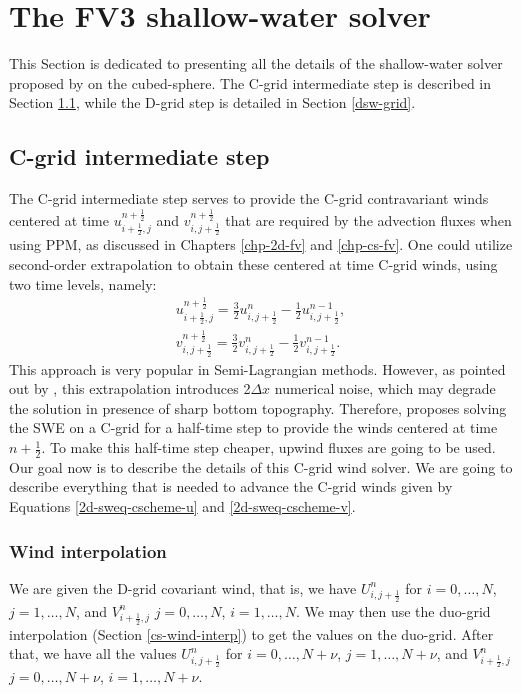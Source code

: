 \section{The FV3 shallow-water solver}
\label{sw:fv3solver}
This Section is dedicated to presenting all the details of the shallow-water solver proposed by \citet{lin:1997} on the cubed-sphere. 
The C-grid intermediate step is described in Section \ref{csw-grid}, while the D-grid step is detailed in Section \ref{dsw-grid}.

\subsection{C-grid intermediate step}
\label{csw-grid}
The C-grid intermediate step serves to provide the  C-grid contravariant winds centered at time 
${u}^{n+\frac{1}{2}}_{i+\frac{1}{2},j}$ and ${v}^{n+\frac{1}{2}}_{i,j+\frac{1}{2}}$
that are required by the advection fluxes when using PPM, as discussed in Chapters \ref{chp-2d-fv} and \ref{chp-cs-fv}. 
One could utilize second-order extrapolation to obtain these centered at time C-grid winds, using two time levels, namely:
\begin{align}
{u}^{n+\frac{1}{2}}_{i+\frac{1}{2},j} = \frac{3}{2} {u}^{n}_{i,j+\frac{1}{2}} - \frac{1}{2} {u}^{n-1}_{i,j+\frac{1}{2}}, \\
{v}^{n+\frac{1}{2}}_{i,j+\frac{1}{2}} = \frac{3}{2} {v}^{n}_{i,j+\frac{1}{2}} - \frac{1}{2} {v}^{n-1}_{i,j+\frac{1}{2}}.
\end{align}
This approach is very popular in Semi-Lagrangian methods.
However, as pointed out by \citet{lin:1997}, this extrapolation introduces 2$\Delta x$ numerical noise, which may degrade the solution in presence
of sharp bottom topography. 
Therefore, \citet{lin:1997} proposes solving the SWE on a C-grid for a half-time step to provide the winds centered at time $n+\frac{1}{2}$. 
To make this half-time step cheaper, upwind fluxes are going to be used.
Our goal now is to describe the details of this C-grid wind solver.
We are going to describe everything that is needed to advance the 
C-grid winds given by Equations \eqref{2d-sweq-cscheme-u} and \eqref{2d-sweq-cscheme-v}.

\subsubsection{Wind interpolation}
We are given the D-grid covariant wind,
that is, we have $U_{i,j+\frac{1}{2}}^n$ for $i=0,\ldots,N$, $j=1,\ldots,N$, 
and $V_{i+\frac{1}{2},j}^n$ $j=0,\ldots,N$, $i=1,\ldots,N$.
We may then use the duo-grid interpolation (Section \ref{cs-wind-interp}) to get the values on the duo-grid.
After that, we have all the values 
$U_{i,j+\frac{1}{2}}^n$ for $i=0,\ldots,N+\nu$, $j=1,\ldots,N+\nu$, 
and $V_{i+\frac{1}{2},j}^n$ $j=0,\ldots,N+\nu$, $i=1,\ldots,N+\nu$.


